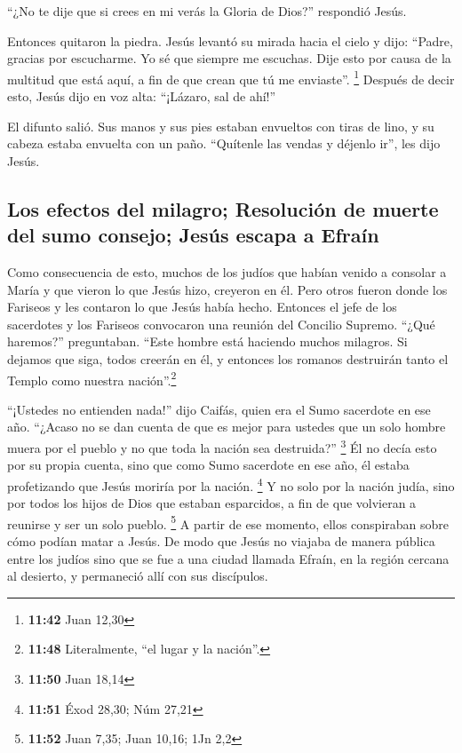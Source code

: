  ``¿No te dije que si crees en mi verás la Gloria de
Dios?'' respondió Jesús.

 Entonces quitaron la piedra. Jesús levantó su mirada
hacia el cielo y dijo: ``Padre, gracias por escucharme. 
Yo sé que siempre me escuchas. Dije esto por causa de la multitud que
está aquí, a fin de que crean que tú me enviaste''. \footnote{\textbf{11:42}
  Juan 12,30}  Después de decir esto, Jesús dijo en voz
alta: ``¡Lázaro, sal de ahí!''

 El difunto salió. Sus manos y sus pies estaban envueltos
con tiras de lino, y su cabeza estaba envuelta con un paño. ``Quítenle
las vendas y déjenlo ir'', les dijo Jesús.

\hypertarget{los-efectos-del-milagro-resoluciuxf3n-de-muerte-del-sumo-consejo-jesuxfas-escapa-a-efrauxedn}{%
\subsection{Los efectos del milagro; Resolución de muerte del sumo
consejo; Jesús escapa a
Efraín}\label{los-efectos-del-milagro-resoluciuxf3n-de-muerte-del-sumo-consejo-jesuxfas-escapa-a-efrauxedn}}

 Como consecuencia de esto, muchos de los judíos que
habían venido a consolar a María y que vieron lo que Jesús hizo,
creyeron en él.  Pero otros fueron donde los Fariseos y
les contaron lo que Jesús había hecho.  Entonces el jefe
de los sacerdotes y los Fariseos convocaron una reunión del Concilio
Supremo. ``¿Qué haremos?'' preguntaban. ``Este hombre está haciendo
muchos milagros.  Si dejamos que siga, todos creerán en
él, y entonces los romanos destruirán tanto el Templo como nuestra
nación''.\footnote{\textbf{11:48} Literalmente, ``el lugar y la
  nación''.}

 ``¡Ustedes no entienden nada!'' dijo Caifás, quien era
el Sumo sacerdote en ese año.  ``¿Acaso no se dan cuenta
de que es mejor para ustedes que un solo hombre muera por el pueblo y no
que toda la nación sea destruida?'' \footnote{\textbf{11:50} Juan 18,14}
 Él no decía esto por su propia cuenta, sino que como
Sumo sacerdote en ese año, él estaba profetizando que Jesús moriría por
la nación. \footnote{\textbf{11:51} Éxod 28,30; Núm 27,21}
 Y no solo por la nación judía, sino por todos los hijos
de Dios que estaban esparcidos, a fin de que volvieran a reunirse y ser
un solo pueblo. \footnote{\textbf{11:52} Juan 7,35; Juan 10,16; 1Jn 2,2}
 A partir de ese momento, ellos conspiraban sobre cómo
podían matar a Jesús.  De modo que Jesús no viajaba de
manera pública entre los judíos sino que se fue a una ciudad llamada
Efraín, en la región cercana al desierto, y permaneció allí con sus
discípulos.

